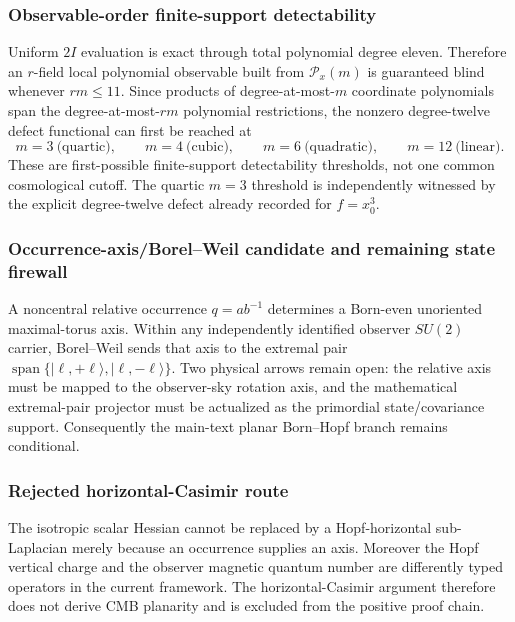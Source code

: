 \documentclass[12pt,a4paper]{article}
\begin{document}
\subsubsection{Observable-order finite-support detectability}
Uniform $2I$ evaluation is exact through total polynomial degree eleven.
Therefore an $r$-field local polynomial observable built from
$\mathcal P_x(m)$ is guaranteed blind whenever $rm\le11$.  Since products
of degree-at-most-$m$ coordinate polynomials span the degree-at-most-$rm$
polynomial restrictions, the nonzero degree-twelve defect functional can
first be reached at
\[
 m=3\ \text{(quartic)},\qquad
 m=4\ \text{(cubic)},\qquad
 m=6\ \text{(quadratic)},\qquad
 m=12\ \text{(linear)}.
\]
These are first-possible finite-support detectability thresholds, not one
common cosmological cutoff.  The quartic $m=3$ threshold is independently
witnessed by the explicit degree-twelve defect already recorded for
$f=x_0^3$.

\subsubsection{Occurrence-axis/Borel--Weil candidate and remaining state firewall}
A noncentral relative occurrence $q=ab^{-1}$ determines a Born-even
unoriented maximal-torus axis.  Within any independently identified observer
$SU(2)$ carrier, Borel--Weil sends that axis to the extremal pair
$\operatorname{span}\{|\ell,+\ell\rangle,|\ell,-\ell\rangle\}$.
Two physical arrows remain open: the relative axis must be mapped to the
observer-sky rotation axis, and the mathematical extremal-pair projector must
be actualized as the primordial state/covariance support.  Consequently the
main-text planar Born--Hopf branch remains conditional.

\subsubsection{Rejected horizontal-Casimir route}
The isotropic scalar Hessian cannot be replaced by a Hopf-horizontal
sub-Laplacian merely because an occurrence supplies an axis.  Moreover the
Hopf vertical charge and the observer magnetic quantum number are differently
typed operators in the current framework.  The horizontal-Casimir argument
therefore does not derive CMB planarity and is excluded from the positive
proof chain.
\end{document}
